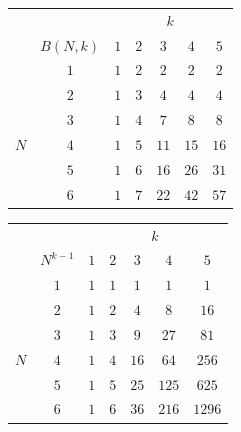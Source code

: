 \begin{center}
    \solidrules
    \begin{tabular}{@{}cc|ccccc@{}}
        \toprule
        & & \multicolumn{5}{c}{\(k\)}\\
        & \(B(N, k)\) & \(1\) & \(2\) & \(3\) & \(4\) & \(5\)\\
        \midrule
        & \(1\) & \(1\) & \(2\) & \(2\) & \(2\) & \(2\)\\
        & \(2\) & \(1\) & \(3\) & \cellcolor{vcregion}\(4\)
        & \cellcolor{vcregion}\(4\) & \cellcolor{vcregion}\(4\)\\
        & \(3\) & \(1\) & \(4\) & \cellcolor{vcregion}\(7\)
        & \cellcolor{vcregion}\(8\) & \cellcolor{vcregion}\(8\)\\
        \(N\) & \(4\) & \(1\) & \(5\) & \cellcolor{vcregion}\(11\)
        & \cellcolor{vcregion}\(15\) & \cellcolor{vcregion}\(16\)\\
        & \(5\) & \(1\) & \(6\) & \cellcolor{vcregion}\(16\)
        & \cellcolor{vcregion}\(26\) & \cellcolor{vcregion}\(31\)\\
        & \(6\) & \(1\) & \(7\) & \cellcolor{vcregion}\(22\)
        & \cellcolor{vcregion}\(42\) & \cellcolor{vcregion}\(57\)\\
        \bottomrule
    \end{tabular}
    \qquad
    \begin{tabular}{@{}cc|ccccc@{}}
        \toprule
        & & \multicolumn{5}{c}{\(k\)}\\
        & \(N^{k-1}\) & \(1\) & \(2\) & \(3\) & \(4\) & \(5\)\\
        \midrule
        & \(1\) & \(1\) & \(1\) & \(1\) & \(1\) & \(1\)\\
        & \(2\) & \(1\) & \(2\) & \cellcolor{vcregion}\(4\)
        & \cellcolor{vcregion}\(8\) & \cellcolor{vcregion}\(16\)\\
        & \(3\) & \(1\) & \(3\) & \cellcolor{vcregion}\(9\)
        & \cellcolor{vcregion}\(27\) & \cellcolor{vcregion}\(81\)\\
        \(N\) & \(4\) & \(1\) & \(4\) & \cellcolor{vcregion}\(16\)
        & \cellcolor{vcregion}\(64\) & \cellcolor{vcregion}\(256\)\\
        & \(5\) & \(1\) & \(5\) & \cellcolor{vcregion}\(25\)
        & \cellcolor{vcregion}\(125\) & \cellcolor{vcregion}\(625\)\\
        & \(6\) & \(1\) & \(6\) & \cellcolor{vcregion}\(36\)
        & \cellcolor{vcregion}\(216\) & \cellcolor{vcregion}\(1296\)\\
        \bottomrule
    \end{tabular}
\end{center}

